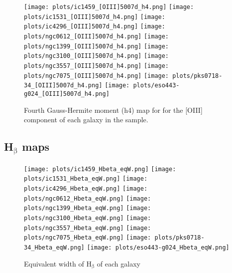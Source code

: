 \documentclass[fleqn,usenatbib,useAMS]{mnras}
\begin{document}
		\begin{figure*}
			\centering
			\texttt{[image: plots/ic1459\_[OIII]5007d\_h4.png]}
			\texttt{[image: plots/ic1531\_[OIII]5007d\_h4.png]}
			\texttt{[image: plots/ic4296\_[OIII]5007d\_h4.png]}
			\texttt{[image: plots/ngc0612\_[OIII]5007d\_h4.png]}
			\texttt{[image: plots/ngc1399\_[OIII]5007d\_h4.png]}
			\texttt{[image: plots/ngc3100\_[OIII]5007d\_h4.png]}
			\texttt{[image: plots/ngc3557\_[OIII]5007d\_h4.png]}
			\texttt{[image: plots/ngc7075\_[OIII]5007d\_h4.png]}
			\texttt{[image: plots/pks0718-34\_[OIII]5007d\_h4.png]}
			\texttt{[image: plots/eso443-g024\_[OIII]5007d\_h4.png]}
			\caption{Fourth Gauss-Hermite moment (h4) map for for the [OIII] component of each galaxy in the sample.}
			\label{fig:OIII_h4}
		\end{figure*}










	\subsection{H$_\mathrm{\beta}$ maps}
		\label{subsec:Hbetamaps}

		\begin{figure*}
			\centering
			\texttt{[image: plots/ic1459\_Hbeta\_eqW.png]}
			\texttt{[image: plots/ic1531\_Hbeta\_eqW.png]}
			\texttt{[image: plots/ic4296\_Hbeta\_eqW.png]}
			\texttt{[image: plots/ngc0612\_Hbeta\_eqW.png]}
			\texttt{[image: plots/ngc1399\_Hbeta\_eqW.png]}
			\texttt{[image: plots/ngc3100\_Hbeta\_eqW.png]}
			\texttt{[image: plots/ngc3557\_Hbeta\_eqW.png]}
			\texttt{[image: plots/ngc7075\_Hbeta\_eqW.png]}
			\texttt{[image: plots/pks0718-34\_Hbeta\_eqW.png]}
			\texttt{[image: plots/eso443-g024\_Hbeta\_eqW.png]}
			\caption{Equivalent width of H$_\mathrm{\beta}$ of each galaxy}
			\label{fig:Hbeta_eqw}
		\end{figure*}
\end{document}
